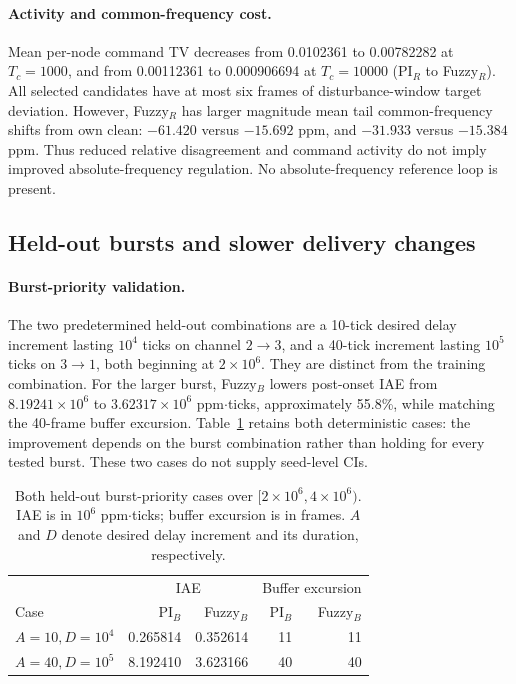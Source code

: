 \paragraph{Activity and common-frequency cost.}
Mean per-node command TV decreases from 0.0102361 to 0.00782282 at
$T_c=1000$, and from 0.00112361 to 0.000906694 at $T_c=10000$
(PI$_R$ to Fuzzy$_R$). All selected candidates have at most six frames
of disturbance-window target deviation. However, Fuzzy$_R$ has larger
magnitude mean tail common-frequency shifts from own clean:
$-61.420$ versus $-15.692$ ppm, and $-31.933$ versus $-15.384$ ppm.
Thus reduced relative disagreement and command activity do not
imply improved absolute-frequency regulation. No absolute-frequency
reference loop is present.

\subsection{Held-out bursts and slower delivery changes}
\label{subsec:eval_burst}

\paragraph{Burst-priority validation.}
The two predetermined held-out combinations are a 10-tick desired
delay increment lasting $10^4$ ticks on channel $2\to3$, and a
40-tick increment lasting $10^5$ ticks on $3\to1$, both beginning
at $2\times10^6$. They are distinct from the training combination.
For the larger burst, Fuzzy$_B$ lowers post-onset IAE from
$8.19241\times10^6$ to $3.62317\times10^6$ ppm$\cdot$ticks,
approximately 55.8\%, while matching the 40-frame buffer excursion.
Table~\ref{tab:eval_heldout_bursts} retains both deterministic cases:
the improvement depends on the burst combination rather than holding
for every tested burst. These two cases do not supply seed-level CIs.

\begin{table}[t]
\caption{Both held-out burst-priority cases over
$[2\times10^6,4\times10^6)$. IAE is in $10^6$ ppm$\cdot$ticks;
buffer excursion is in frames. $A$ and $D$ denote desired delay
increment and its duration, respectively.}
\label{tab:eval_heldout_bursts}
\centering
\begin{tabular}{@{}lrrrr@{}}\toprule
 & \multicolumn{2}{c}{IAE} & \multicolumn{2}{c}{Buffer excursion}\\
Case & PI$_B$ & Fuzzy$_B$ & PI$_B$ & Fuzzy$_B$\\\midrule
$A=10,D=10^4$ & 0.265814 & 0.352614 & 11 & 11\\
$A=40,D=10^5$ & 8.192410 & 3.623166 & 40 & 40\\\bottomrule
\end{tabular}
\end{table}

